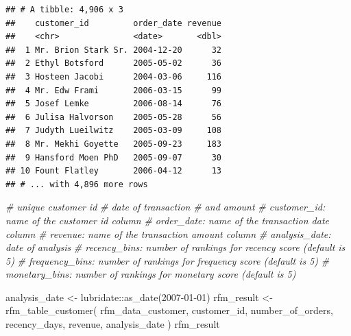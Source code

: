 \documentclass[
]{book}
\newenvironment{Shaded}{\begin{snugshade}}{\end{snugshade}}
\newcommand{\CommentTok}[1]{\textcolor[rgb]{0.56,0.35,0.01}{\textit{#1}}}
\newcommand{\FunctionTok}[1]{\textcolor[rgb]{0.00,0.00,0.00}{#1}}
\newcommand{\NormalTok}[1]{#1}
\newcommand{\OtherTok}[1]{\textcolor[rgb]{0.56,0.35,0.01}{#1}}
\newcommand{\SpecialCharTok}[1]{\textcolor[rgb]{0.00,0.00,0.00}{#1}}
\newcommand{\StringTok}[1]{\textcolor[rgb]{0.31,0.60,0.02}{#1}}
\begin{document}
\begin{verbatim}
## # A tibble: 4,906 x 3
##    customer_id         order_date revenue
##    <chr>               <date>       <dbl>
##  1 Mr. Brion Stark Sr. 2004-12-20      32
##  2 Ethyl Botsford      2005-05-02      36
##  3 Hosteen Jacobi      2004-03-06     116
##  4 Mr. Edw Frami       2006-03-15      99
##  5 Josef Lemke         2006-08-14      76
##  6 Julisa Halvorson    2005-05-28      56
##  7 Judyth Lueilwitz    2005-03-09     108
##  8 Mr. Mekhi Goyette   2005-09-23     183
##  9 Hansford Moen PhD   2005-09-07      30
## 10 Fount Flatley       2006-04-12      13
## # ... with 4,896 more rows
\end{verbatim}

\begin{Shaded}
\begin{Highlighting}[]
\CommentTok{\# unique customer id}
\CommentTok{\# date of transaction}
\CommentTok{\# and amount}
\CommentTok{\# customer\_id: name of the customer id column}
\CommentTok{\# order\_date: name of the transaction date column}
\CommentTok{\# revenue: name of the transaction amount column}
\CommentTok{\# analysis\_date: date of analysis}
\CommentTok{\# recency\_bins: number of rankings for recency score (default is 5)}
\CommentTok{\# frequency\_bins: number of rankings for frequency score (default is 5)}
\CommentTok{\# monetary\_bins: number of rankings for monetary score (default is 5)}
\end{Highlighting}
\end{Shaded}

\begin{Shaded}
\begin{Highlighting}[]
\NormalTok{analysis\_date }\OtherTok{\textless{}{-}}\NormalTok{ lubridate}\SpecialCharTok{::}\FunctionTok{as\_date}\NormalTok{(}\StringTok{\textquotesingle{}2007{-}01{-}01\textquotesingle{}}\NormalTok{)}
\NormalTok{rfm\_result }\OtherTok{\textless{}{-}}
    \FunctionTok{rfm\_table\_customer}\NormalTok{(}
\NormalTok{        rfm\_data\_customer,}
\NormalTok{        customer\_id,}
\NormalTok{        number\_of\_orders,}
\NormalTok{        recency\_days,}
\NormalTok{        revenue,}
\NormalTok{        analysis\_date}
\NormalTok{    )}
\NormalTok{rfm\_result}
\end{Highlighting}
\end{Shaded}
\end{document}
